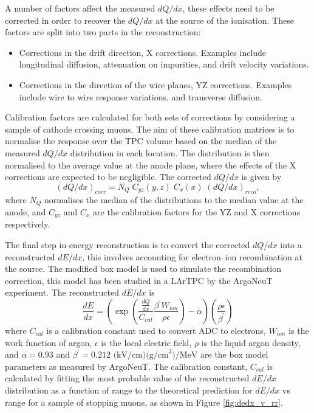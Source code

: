 A number of factors affect the measured $dQ/dx$, these effects need to be 
corrected in order to recover the $dQ/dx$ at the source of the ionisation. 
These factors are split into two parts in the \protodune{} reconstruction:
\begin{itemize}
	\item Corrections in the drift direction, X corrections. Examples include 
		longitudinal diffusion, attenuation on impurities, and drift velocity
		variations.
	\item Corrections in the direction of the wire planes, YZ corrections.
		Examples include wire to wire response variations, and transverse diffusion.
\end{itemize}
Calibration factors are calculated for both sets of corrections by considering a
sample of cathode crossing muons. The aim of these calibration matrices is to 
normalise the response over the TPC volume based on the median of the measured
$dQ/dx$ distribution in each location. The distribution is then normalised to 
the average value at the anode plane, where the effects of the X corrections are
expected to be negligible. The corrected $dQ/dx$ is given by
\begin{equation*}
	\left( dQ/dx \right)_{corr} = N_Q \; C_{yz}(y, z) \; C_x(x) \; \left( dQ/dx
	\right)_{reco},
\end{equation*}
where $N_Q$ normalises the median of the distributions to the median value at
the anode, and $C_{yz}$ and $C_{x}$ are the calibration factors for the YZ and 
X corrections respectively.

The final step in energy reconstruction is to convert the corrected $dQ/dx$ into
a reconstructed $dE/dx$, this involves accounting for electron--ion
recombination at the source. The modified box model is used to simulate the
recombination correction, this model has been studied in a LArTPC by the 
ArgoNeuT experiment\cite{Acciarri2013a}. The reconstructed $dE/dx$ is 
\begin{equation*}
	\frac{dE}{dx} = \left( \exp \left( \frac{\frac{dQ}{dx}}{C_{cal}} \frac{\beta^\prime
	W_{ion}}{\rho \epsilon} \right) - \alpha \right)
	\left( \frac{\rho \epsilon}{\beta^\prime} \right)
\end{equation*}
where $C_{cal}$ is a calibration constant used to convert ADC to electrons,
$W_{ion}$ is the work function of argon, $\epsilon$ is the local electric field,
$\rho$ is the liquid argon density, and \(\alpha = 0.93\) and 
\(\beta^\prime = 0.212 \mbox{ (kV/cm)(g/cm}^3) / \mbox{MeV}\) are the box model 
parameters as measured by ArgoNeuT. The calibration constant, $C_{cal}$ is 
calculated by fitting the most probable value of the reconstructed $dE/dx$ 
distribution as a function of range to the theoretical prediction for $dE/dx$ 
vs range for a sample of stopping muons, as shown in Figure \ref{fig:dedx_v_rr}.

